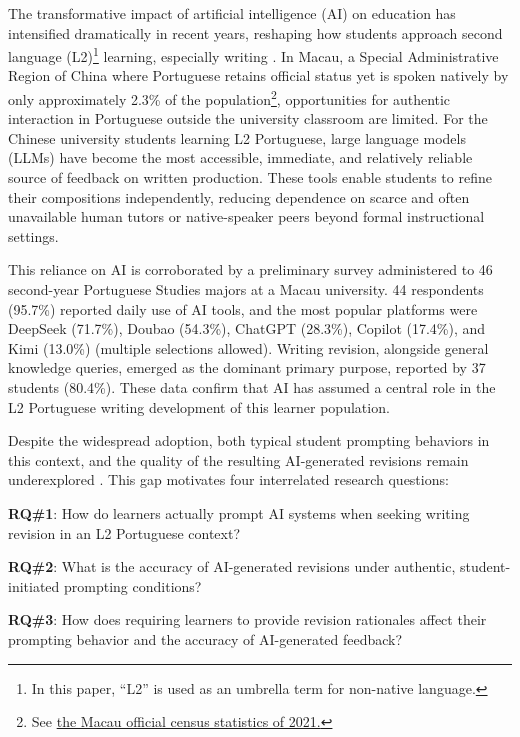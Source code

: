 \documentclass[english]{textolivre}
\begin{document}
The transformative impact of artificial intelligence (AI) on education has intensified dramatically in recent years, reshaping how students approach second language (L2)\footnote{In this paper, ``L2'' is used as an umbrella term for non-native language.} learning, especially writing \cite{BARROT2023100745,crompton2023,Kohnke2023,lo2023,Luo2025}. In Macau, a Special Administrative Region of China where Portuguese retains official status yet is spoken natively by only approximately 2.3\% of the population\footnote{See \href{https://www.dsec.gov.mo/getAttachment/fda23546-c321-47ae-a5b3-b4a5071cf732/P_CEN_PUB_2021_Y.aspx}{the Macau official census statistics of 2021.}}, opportunities for authentic interaction in Portuguese outside the university classroom are limited. For the Chinese university students learning L2 Portuguese, large language models (LLMs) have become the most accessible, immediate, and relatively reliable source of feedback on written production. These tools enable students to refine their compositions independently, reducing dependence on scarce and often unavailable human tutors or native-speaker peers beyond formal instructional settings.

This reliance on AI is corroborated by a preliminary survey administered to 46 second-year Portuguese Studies majors at a Macau university. 44 respondents (95.7\%) reported daily use of AI tools, and the most popular platforms were DeepSeek (71.7\%), Doubao (54.3\%), ChatGPT (28.3\%), Copilot (17.4\%), and Kimi (13.0\%) (multiple selections allowed). Writing revision, alongside general knowledge queries, emerged as the dominant primary purpose, reported by 37 students (80.4\%). These data confirm that AI has assumed a central role in the L2 Portuguese writing development of this learner population. 

Despite the widespread adoption, both typical student prompting behaviors in this context, and the quality of the resulting AI-generated revisions remain underexplored \cite{hwang2024exploring}. This gap motivates four interrelated research questions: 

    \textbf{RQ\#1}: How do learners actually prompt AI systems when seeking writing revision in an L2 Portuguese context?

    \textbf{RQ\#2}: What is the accuracy of AI-generated revisions under authentic, student-initiated prompting conditions?

    \textbf{RQ\#3}: How does requiring learners to provide revision rationales affect their prompting behavior and the accuracy of AI-generated feedback?
    
\end{document}
